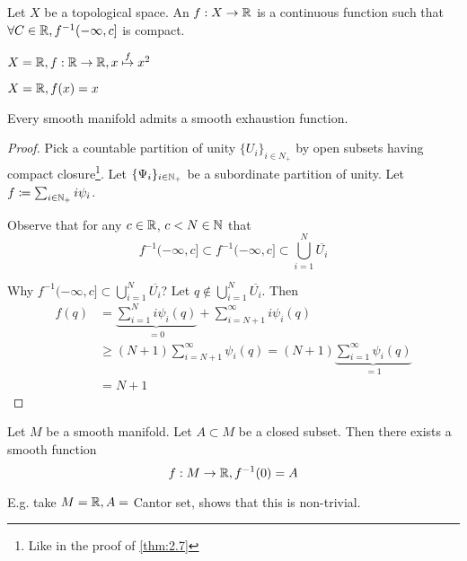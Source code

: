\begin{definition*}
    Let \(X\) be a topological space. An  \(f:X\to\mathbb{R}\) is a 
    continuous function such that \(\forall C\in \mathbb{R},f^{-1}(-\infty,c]\) is compact. 
\end{definition*}

\begin{example}
    \(X=\mathbb{R},f:\mathbb{R}\to\mathbb{R},x\stackrel{f}{\mapsto} x^2\)
\end{example}

\begin{example}
    \(X=\mathbb{R},f(x)=x\)
\end{example}

\begin{proposition}\label{prop:2.10}
    Every smooth manifold admits a smooth exhaustion function.
\end{proposition}

\begin{proof}
    Pick a countable partition of unity \(\{U_i\}_{i\in N_+}\) by open subsets having compact closure\footnote{Like in the proof of \ref{thm:2.7}}.
    Let \(\{\Psi_i\}_{i\in\mathbb{N}_+}\) be a subordinate partition of unity. Let \(f\coloneqq \sum_{i\in\mathbb{N}_+}i\psi_i\).
    
    Observe that for any \(c\in\mathbb{R}\), \(c<N\in \mathbb{N}\) that \[f^{-1}(-\infty,c]\subset f^{-1}(-\infty,c]\subset \bigcup_{i=1}^N \overline{U_i}\]

    Why \(f^{-1}(-\infty,c]\subset\bigcup_{i=1}^N \overline{U_i}\)? Let \(q\not\in \bigcup_{i=1}^N \overline{U_i}\).
    Then \begin{align*}
        f(q)&=  \underbrace{\sum_{i=1}^{N} i \psi_i(q)}_{=0} + \sum_{i=N+1}^\infty i\psi_i(q)\\
        & \geq (N+1)\sum_{i=N+1}^\infty\psi_i(q) = (N+1)\underbrace{\sum_{i=1}^\infty \psi_i(q)}_{=1}\\
        &=N+1 
    \end{align*} 
\end{proof}

 \begin{proposition}\label{prop:2.11}
    Let \(M\) be a smooth manifold. Let \(A\subset M\) be a closed subset. Then 
    there exists a smooth function \[f:M\to\mathbb{R},f^{-1}(0)=A\]
 \end{proposition}

 E.g. take \(M=\mathbb{R},A=\) Cantor set, shows that this is non-trivial.


